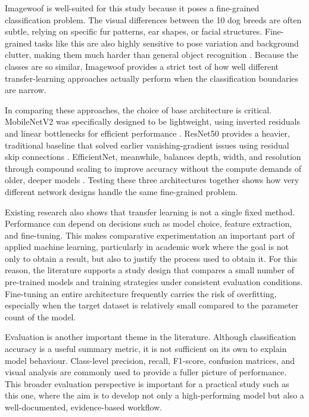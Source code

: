 \documentclass[12pt, a4paper]{article}
\begin{document}
Imagewoof is well-suited for this study because it poses a fine-grained classification problem. The visual differences between the 10 dog breeds are often subtle, relying on specific fur patterns, ear shapes, or facial structures. Fine-grained tasks like this are also highly sensitive to pose variation and background clutter, making them much harder than general object recognition \citep{shorten2019survey}. Because the classes are so similar, Imagewoof provides a strict test of how well different transfer-learning approaches actually perform when the classification boundaries are narrow.

In comparing these approaches, the choice of base architecture is critical. MobileNetV2 was specifically designed to be lightweight, using inverted residuals and linear bottlenecks for efficient performance \citep{howard2017mobilenets}. ResNet50 provides a heavier, traditional baseline that solved earlier vanishing-gradient issues using residual skip connections \citep{he2016deep}. EfficientNet, meanwhile, balances depth, width, and resolution through compound scaling to improve accuracy without the compute demands of older, deeper models \citep{tan2019efficientnet}. Testing these three architectures together shows how very different network designs handle the same fine-grained problem.

Existing research also shows that transfer learning is not a single fixed method. Performance can depend on decisions such as model choice, feature extraction, and fine-tuning. This makes comparative experimentation an important part of applied machine learning, particularly in academic work where the goal is not only to obtain a result, but also to justify the process used to obtain it. For this reason, the literature supports a study design that compares a small number of pre-trained models and training strategies under consistent evaluation conditions. Fine-tuning an entire architecture frequently carries the risk of overfitting, especially when the target dataset is relatively small compared to the parameter count of the model.

Evaluation is another important theme in the literature. Although classification accuracy is a useful summary metric, it is not sufficient on its own to explain model behaviour. Class-level precision, recall, F1-score, confusion matrices, and visual analysis are commonly used to provide a fuller picture of performance. This broader evaluation perspective is important for a practical study such as this one, where the aim is to develop not only a high-performing model but also a well-documented, evidence-based workflow.
\end{document}
